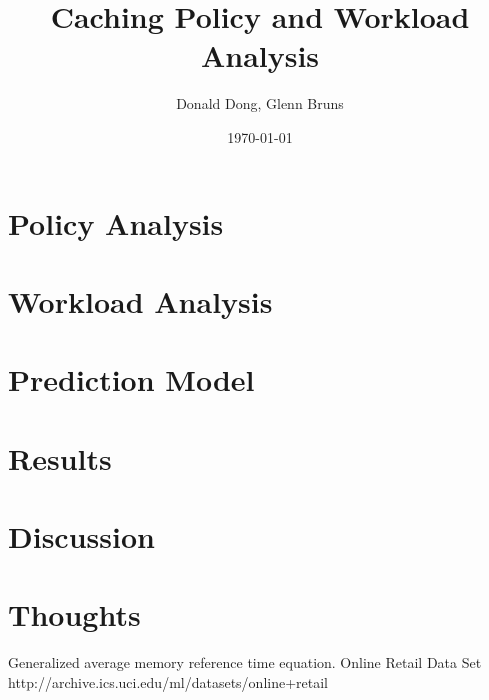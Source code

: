 \documentclass{article}
\title{Caching Policy and Workload Analysis}
\author{Donald Dong, Glenn Bruns}
\date{\today}
\begin{document}
  \maketitle
  
  \section{Policy Analysis}
  \section{Workload Analysis}
  \section{Prediction Model}
  \section{Results}
  \section{Discussion}
  \section{Thoughts}
  Generalized average memory reference time equation.
  Online Retail Data Set
  http://archive.ics.uci.edu/ml/datasets/online+retail
  
  
\end{document}
